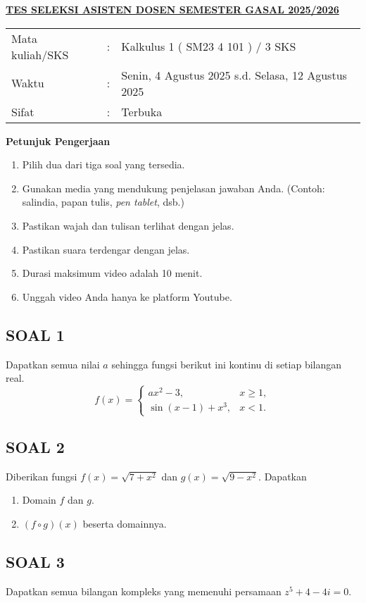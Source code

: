 \documentclass[10pt,openany,a4paper]{article}
\begin{document}
\begin{center}
  {\underline{\textbf{\MakeUppercase{Tes Seleksi Asisten Dosen Semester Gasal 2025/2026}}}}
\end{center}

\begin{center}
  \begin{tabular}{lcl}
    Mata kuliah/SKS & : & Kalkulus 1 ( SM23 4 101 ) / 3 SKS                  \\
    Waktu           & : & Senin, 4 Agustus 2025 s.d. Selasa, 12 Agustus 2025 \\
    Sifat           & : & Terbuka
  \end{tabular}
\end{center}

\vspace{0.1cm}
\noindent\makebox[\linewidth]{\rule{\linewidth}{2pt}}
\vspace{0.1cm}

\noindent
\textbf{Petunjuk Pengerjaan}
\begin{enumerate}[label=\arabic*.]
  \item Pilih dua dari tiga soal yang tersedia.
  \item Gunakan media yang mendukung penjelasan jawaban Anda. (Contoh: salindia, papan tulis, \textit{pen tablet}, dsb.)
  \item Pastikan wajah dan tulisan terlihat dengan jelas.
  \item Pastikan suara terdengar dengan jelas.
  \item Durasi maksimum video adalah 10 menit.
  \item Unggah video Anda hanya ke platform Youtube.
\end{enumerate}

\vspace{0.1cm}
\noindent\makebox[\linewidth]{\rule{\linewidth}{2pt}}

\subsection*{SOAL 1}
Dapatkan semua nilai \( a \) sehingga fungsi berikut ini kontinu di setiap bilangan real.
\[
  f(x) =
  \begin{cases}
    ax^2 - 3,          & x \geq 1, \\
    \sin(x - 1) + x^3, & x < 1.
  \end{cases}
\]

\subsection*{SOAL 2}
Diberikan fungsi \( f(x) = \sqrt{7 + x^2} \) dan \( g(x) = \sqrt{9 - x^2} \). Dapatkan
\begin{enumerate}[label=(\alph*)]
  \item Domain \( f \) dan \( g \).
  \item \( (f \circ g)(x) \) beserta domainnya.
\end{enumerate}

\subsection*{SOAL 3}
Dapatkan semua bilangan kompleks yang memenuhi persamaan \( z^5 + 4 - 4i = 0 \).

\newpage
\end{document}
